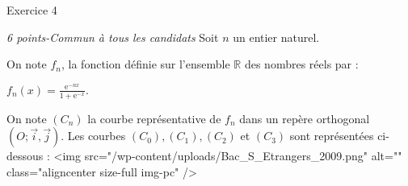 
%
\begin{h2}Exercice 4\end{h2}
\textit{6 points-Commun à tous les candidats}
Soit $n$ un entier naturel.
\par
On note $f_{n}$, la fonction définie sur l'ensemble $\mathbb{R}$ des nombres réels par :
\par
$f_{n}\left(x\right)=\frac{\text{e}^{-nx}}{1+\text{e}^{-x}}.$
\par
On note $\left(C_{n}\right)$ la courbe représentative de $f_{n}$ dans un repère orthogonal $\left(O; \vec{i}, \vec{j}\right)$. Les courbes $\left(C_{0}\right),\left(C_{1}\right),\left(C_{2}\right)$ et $\left(C_{3}\right)$ sont représentées ci-dessous :
<img src="/wp-content/uploads/Bac_S_Etrangers_2009.png" alt="" class="aligncenter size-full  img-pc" />

